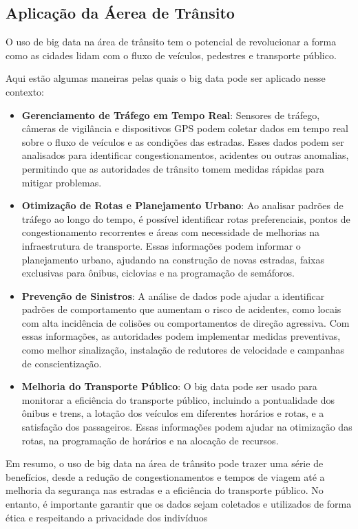 \subsection{Aplicação da Áerea de Trânsito}

O uso de big data na área de trânsito tem o potencial de revolucionar a forma como as cidades lidam com o fluxo de veículos, pedestres e transporte público. 

Aqui estão algumas maneiras pelas quais o big data pode ser aplicado nesse contexto:

\begin{itemize}
    \item \textbf{Gerenciamento de Tráfego em Tempo Real}: Sensores de tráfego, câmeras de vigilância e dispositivos GPS podem coletar dados em tempo real sobre o fluxo de veículos e as condições das estradas. Esses dados podem ser analisados para identificar congestionamentos, acidentes ou outras anomalias, permitindo que as autoridades de trânsito tomem medidas rápidas para mitigar problemas.
    \item \textbf{Otimização de Rotas e Planejamento Urbano}: Ao analisar padrões de trá\-fego ao longo do tempo, é possível identificar rotas preferenciais, pontos de congestionamento recorrentes e áreas com necessidade de melhorias na infraestrutura de transporte. Essas informações podem informar o planejamento urbano, ajudando na construção de novas estradas, faixas exclusivas para ônibus, ciclovias e na programação de semáforos.
    \item \textbf{Prevenção de Sinistros}: A análise de dados pode ajudar a identificar padrões de comportamento que aumentam o risco de acidentes, como locais com alta incidência de colisões ou comportamentos de direção agressiva. Com essas informações, as autoridades podem implementar medidas preventivas, como melhor sinalização, instalação de redutores de velocidade e campanhas de conscientização.
    \item \textbf{Melhoria do Transporte Público}: O big data pode ser usado para monitorar a eficiência do transporte público, incluindo a pontualidade dos ônibus e trens, a lotação dos veículos em diferentes horários e rotas, e a satisfação dos passageiros. Essas informações podem ajudar na otimização das rotas, na programação de horários e na alocação de recursos.
\end{itemize}

Em resumo, o uso de big data na área de trânsito pode trazer uma série de benefícios, desde a redução de congestionamentos e tempos de viagem até a melhoria da segurança nas estradas e a eficiência do transporte público. No entanto, é importante garantir que os dados sejam coletados e utilizados de forma ética e respeitando a privacidade dos indivíduos



